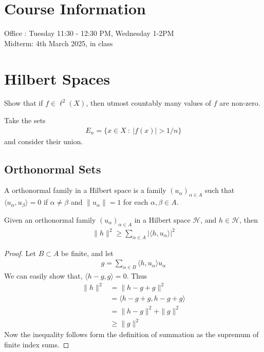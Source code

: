 
\chapter*{Course Information}

Office : Tuesday 11:30 - 12:30 PM, Wednesday 1-2PM\\
Midterm: 4th March 2025, in class

\chapter{Hilbert Spaces}

\begin{exercise}[Warm up]
  \label{warm_up1}
  Show that if $f \in \ell^{2}(X)$, then utmost countably many values
  of $f$ are non-zero.
\end{exercise}
\begin{solution}
  Take the sets
  \begin{align*}
    E_n = \{ x \in X  \ : \  |f(x)|>1/n \}
  \end{align*}
  and consider their union.
\end{solution}

\section{Orthonormal Sets}

\begin{definition}
  A orthonormal family in a Hilbert space is a family
  $(u_\alpha)_{\alpha \in A}$ such that $\langle  u_\alpha ,  u_\beta
  \rangle  = 0$ if $\alpha \neq \beta$ and $\|u_\alpha\| = 1$ for
  each $ \alpha, \beta \in A$.
\end{definition}

\begin{theorem}
  Given an orthonormal family $(u_\alpha)_{\alpha \in A}$ in a
  Hilbert space $\mathcal{H}$, and $h \in \mathcal{H}$, then
  \begin{align*}
    \|h\|^2 \ge \sum_{\alpha \in  A} |\langle h , u_\alpha \rangle |^2
  \end{align*}
\end{theorem}
\begin{proof}
  Let $B \subset A$ be finite, and let
  \begin{align*}
    g = \sum_{\alpha \in  B} \langle h , u_\alpha \rangle  u_\alpha
  \end{align*}
  We can easily show that, $\langle h-g , g \rangle  = 0$. Thus
  \begin{align*}
    \|h\|^2 &= \|h - g + g\|^2 \\
    &= \langle h-g +g , h-g +g \rangle \\
    &= \|h - g\|^2 + \|g\|^2 \\
    & \ge \|g\|^2
  \end{align*}
  Now the inequality follows form the definition of summation as the
  supremum of finite index sums.
\end{proof}

